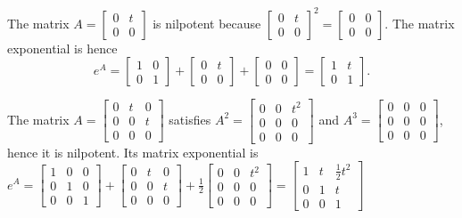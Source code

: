 The matrix $A=
\begin{bmatrix}
 0 & t \\
 0 & 0
\end{bmatrix}
$ is nilpotent because 
$
\begin{bmatrix}
 0 & t \\
 0 & 0
\end{bmatrix}
^2
=
\begin{bmatrix}
 0 & 0 \\
 0 & 0
\end{bmatrix}
$. 
The matrix exponential is hence 
$$e^A = 
\begin{bmatrix}
 1 & 0 \\
 0 & 1
\end{bmatrix}
+
\begin{bmatrix}
 0 & t \\
 0 & 0
\end{bmatrix}
+
\begin{bmatrix}
 0 & 0 \\
 0 & 0
\end{bmatrix}
=
\begin{bmatrix}
 1 & t \\
 0 & 1
\end{bmatrix}
.
$$

The matrix $A=
\begin{bmatrix}
 0 & t & 0 \\
 0 & 0 & t \\
 0 & 0 & 0
\end{bmatrix}
$ satisfies $A^2 = 
\begin{bmatrix}
 0 & 0 & t^2 \\
 0 & 0 & 0 \\
 0 & 0 & 0
\end{bmatrix}
$ and
$A^3 = 
\begin{bmatrix}
 0 & 0 & 0 \\
 0 & 0 & 0 \\
 0 & 0 & 0
\end{bmatrix}
$, hence it is nilpotent. Its matrix exponential is
$e^A=
\begin{bmatrix}
 1 & 0 & 0 \\
 0 & 1 & 0 \\
 0 & 0 & 1
\end{bmatrix}
+
\begin{bmatrix}
 0 & t & 0 \\
 0 & 0 & t \\
 0 & 0 & 0
\end{bmatrix}
+\frac{1}{2}
\begin{bmatrix}
 0 & 0 & t^2 \\
 0 & 0 & 0 \\
 0 & 0 & 0
\end{bmatrix}
=
\begin{bmatrix}
 1 & t & \frac{1}{2}t^2 \\
 0 & 1 & t \\
 0 & 0 & 1
\end{bmatrix}
$


